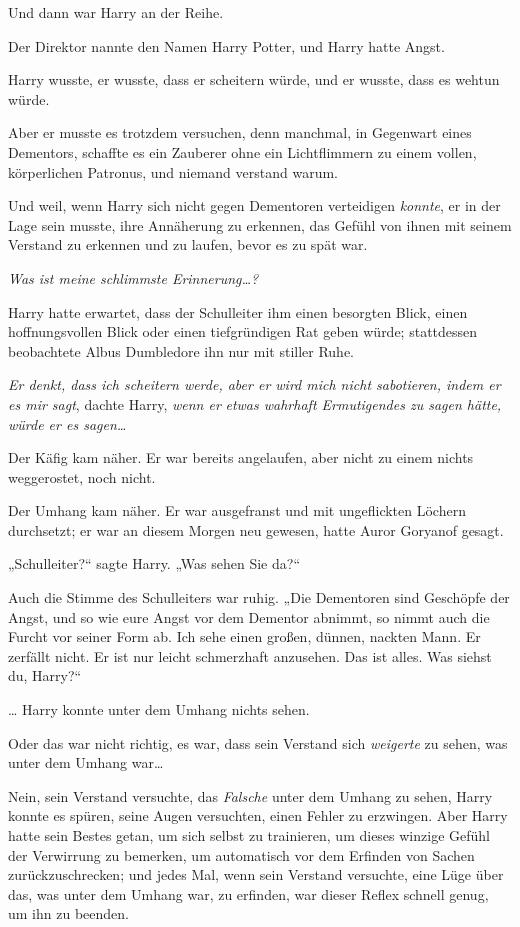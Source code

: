 {Und dann war Harry an der Reihe.

Der Direktor nannte den Namen Harry Potter, und Harry hatte Angst.

Harry wusste, er wusste, dass er scheitern würde, und er wusste, dass es wehtun würde.

Aber er musste es trotzdem versuchen, denn manchmal, in Gegenwart eines Dementors, schaffte es ein Zauberer ohne ein Lichtflimmern zu einem vollen, körperlichen Patronus, und niemand verstand warum.

Und weil, wenn Harry sich nicht gegen Dementoren verteidigen \emph{konnte}, er in der Lage sein musste, ihre Annäherung zu erkennen, das Gefühl von ihnen mit seinem Verstand zu erkennen und zu laufen, bevor es zu spät war.

\emph{Was ist meine schlimmste Erinnerung…?}

Harry hatte erwartet, dass der Schulleiter ihm einen besorgten Blick, einen hoffnungsvollen Blick oder einen tiefgründigen Rat geben würde; stattdessen beobachtete Albus Dumbledore ihn nur mit stiller Ruhe.

\emph{Er denkt, dass ich scheitern werde, aber er wird mich nicht sabotieren, indem er es mir sagt}, dachte Harry, \emph{wenn er} \emph{etwas wahrhaft Ermutigendes zu sagen hätte, würde er es sagen…}

Der Käfig kam näher. Er war bereits angelaufen, aber nicht zu einem nichts weggerostet, noch nicht.

Der Umhang kam näher. Er war ausgefranst und mit ungeflickten Löchern durchsetzt; er war an diesem Morgen neu gewesen, hatte Auror Goryanof gesagt.

„Schulleiter?“ sagte Harry. „Was sehen Sie da?“

Auch die Stimme des Schulleiters war ruhig. „Die Dementoren sind Geschöpfe der Angst, und so wie eure Angst vor dem Dementor abnimmt, so nimmt auch die Furcht vor seiner Form ab. Ich sehe einen großen, dünnen, nackten Mann. Er zerfällt nicht. Er ist nur leicht schmerzhaft anzusehen. Das ist alles. Was siehst du, Harry?“

… Harry konnte unter dem Umhang nichts sehen.

Oder das war nicht richtig, es war, dass sein Verstand sich \emph{weigerte} zu sehen, was unter dem Umhang war…

Nein, sein Verstand versuchte, das \emph{Falsche} unter dem Umhang zu sehen, Harry konnte es spüren, seine Augen versuchten, einen Fehler zu erzwingen. Aber Harry hatte sein Bestes getan, um sich selbst zu trainieren, um dieses winzige Gefühl der Verwirrung zu bemerken, um automatisch vor dem Erfinden von Sachen zurückzuschrecken; und jedes Mal, wenn sein Verstand versuchte, eine Lüge über das, was unter dem Umhang war, zu erfinden, war dieser Reflex schnell genug, um ihn zu beenden.

}

